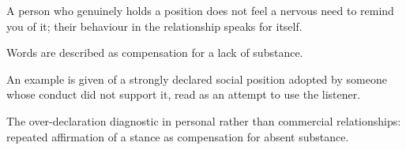 

\begin{distilled}
  \item A person who genuinely holds a position does not feel a nervous need to remind you of it; their behaviour in the relationship speaks for itself.
  \item Words are described as compensation for a lack of substance.
  \item An example is given of a strongly declared social position adopted by someone whose conduct did not support it, read as an attempt to use the listener.
\end{distilled}

\begin{unique}
  \item The over-declaration diagnostic in personal rather than commercial relationships: repeated affirmation of a stance as compensation for absent substance.
\end{unique}
